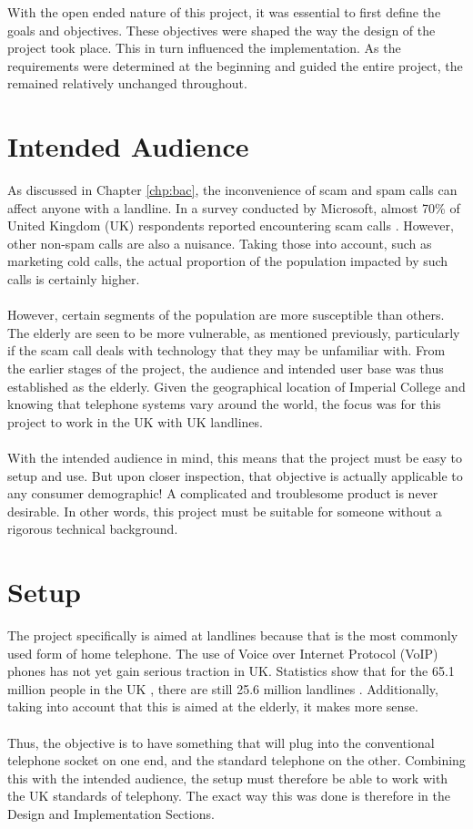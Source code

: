 \documentclass[main.tex]{subfiles}
\begin{document}
With the open ended nature of this project, it was essential to first define the goals and objectives. These objectives were shaped the way the design of the project took place. This in turn influenced the implementation. As the requirements were determined at the beginning and guided the entire project, the remained relatively unchanged throughout.

\section{Intended Audience}
As discussed in Chapter \ref{chp:bac}, the inconvenience of scam and spam calls can affect anyone with a landline. In a survey conducted by Microsoft, almost 70\% of United Kingdom (UK) respondents reported encountering scam calls \cite{microsoft-survey}. However, other non-spam calls are also a nuisance. Taking those into account, such as marketing cold calls, the actual proportion of the population impacted by such calls is certainly higher.
\\\\
However, certain segments of the population are more susceptible than others. The elderly are seen to be more vulnerable, as mentioned previously, particularly if the scam call deals with technology that they may be unfamiliar with. From the earlier stages of the project, the audience and intended user base was thus established as the elderly. Given the geographical location of Imperial College and knowing that telephone systems vary around the world, the focus was for this project to work in the UK with UK landlines.
\\\\
With the intended audience in mind, this means that the project must be easy to setup and use. But upon closer inspection, that objective is actually applicable to any consumer demographic! A complicated and troublesome product is never desirable. In other words, this project must be suitable for someone without a rigorous technical background.

\section{Setup}
The project specifically is aimed at landlines because that is the most commonly used form of home telephone. The use of Voice over Internet Protocol (VoIP) phones has not yet gain serious traction in UK. Statistics show that for the 65.1 million people in the UK \cite{ons}, there are still 25.6 million landlines \cite{ofcom}. Additionally, taking into account that this is aimed at the elderly, it makes more sense.
\\\\
Thus, the objective is to have something that will plug into the conventional telephone socket on one end, and the standard telephone on the other. Combining this with the intended audience, the setup must therefore be able to work with the UK standards of telephony. The exact way this was done is therefore in the Design and Implementation Sections.
\end{document}
